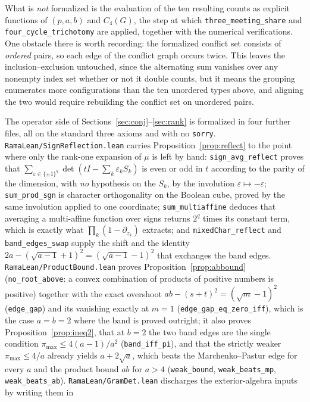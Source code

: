 \documentclass[11pt]{article}
\theoremstyle{remark}
\begin{document}
What is \emph{not} formalized is the evaluation of the ten resulting counts as
explicit functions of $(p,a,b)$ and $C_4(G)$, the step at which
\texttt{three\_meeting\_share} and \texttt{four\_cycle\_trichotomy} are applied, together with the numerical verifications. One obstacle there is worth recording:
the formalized conflict set consists of \emph{ordered} pairs, so each edge of the
conflict graph occurs twice. This leaves the inclusion--exclusion untouched, since
the alternating sum vanishes over any nonempty index set whether or not it double
counts, but it means the grouping enumerates more configurations than the ten
unordered types above, and aligning the two would require rebuilding the conflict
set on unordered pairs.

The operator side of Sections~\ref{sec:conj}--\ref{sec:rank} is formalized in four
further files, all on the standard three axioms and with no \texttt{sorry}.
\texttt{RamaLean/SignReflection.lean} carries
Proposition~\ref{prop:reflect} to the point where only the rank-one expansion of
$\mu$ is left by hand: \texttt{sign\_avg\_reflect} proves that
$\sum_{\varepsilon\in\{\pm1\}^q}\det(tI-\sum_k\varepsilon_kS_k)$ is even or odd in
$t$ according to the parity of the dimension, with \emph{no} hypothesis on the
$S_k$, by the involution $\varepsilon\mapsto-\varepsilon$; \texttt{sum\_prod\_sgn}
is character orthogonality on the Boolean cube, proved by the same involution
applied to one coordinate; \texttt{sum\_multiaffine} deduces that averaging a
multi-affine function over signs returns $2^q$ times its constant term, which is
exactly what $\prod_k(1-\partial_{z_k})$ extracts; and
\texttt{mixedChar\_reflect} and \texttt{band\_edges\_swap} supply the shift and the
identity $2a-(\sqrt{a-1}+1)^2=(\sqrt{a-1}-1)^2$ that exchanges the band edges.
\texttt{RamaLean/ProductBound.lean} proves Proposition~\ref{prop:abbound}
(\texttt{no\_root\_above}: a convex combination of products of positive numbers is
positive) together with the exact overshoot $ab-(s+t)^2=(\sqrt m-1)^2$
(\texttt{edge\_gap}) and its vanishing exactly at $m=1$
(\texttt{edge\_gap\_eq\_zero\_iff}), which is the case $a=b=2$ where the band is
proved outright; it also proves Proposition~\ref{prop:ineq2}, that at $b=2$ the two
band edges are the single condition $\pi_{\max}\le4(a-1)/a^2$
(\texttt{band\_iff\_pi}), and that the strictly weaker $\pi_{\max}\le4/a$ already
yields $a+2\sqrt a$, which beats the Marchenko--Pastur edge for every $a$ and the
product bound $ab$ for $a>4$ (\texttt{weak\_bound}, \texttt{weak\_beats\_mp},
\texttt{weak\_beats\_ab}). \texttt{RamaLean/GramDet.lean} discharges the exterior-algebra inputs by writing them in
\end{document}
